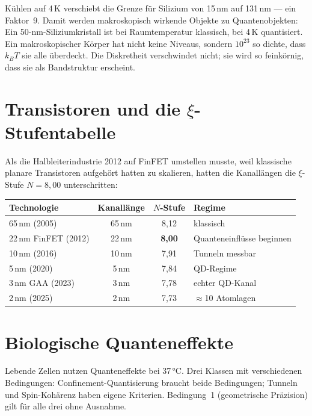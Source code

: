 Kühlen auf 4\,K verschiebt die Grenze für Silizium von 15\,nm auf
131\,nm --- ein Faktor~9. Damit werden makroskopisch wirkende Objekte zu
Quantenobjekten: Ein 50-nm-Siliziumkristall ist bei Raumtemperatur
klassisch, bei 4\,K quantisiert. Ein makroskopischer Körper hat nicht
keine Niveaus, sondern $10^{23}$ so dichte, dass $k_BT$ sie alle
überdeckt. Die Diskretheit verschwindet nicht; sie wird so feinkörnig,
dass sie als Bandstruktur erscheint.

\section{Transistoren und die $\xi$-Stufentabelle}

Als die Halbleiterindustrie 2012 auf FinFET umstellen musste, weil
klassische planare Transistoren aufgehört hatten zu skalieren, hatten die
Kanallängen die $\xi$-Stufe $N = 8{,}00$ unterschritten:

\begin{center}
\small
\begin{tabular}{p{3.5cm}ccp{2.8cm}}
\toprule
\textbf{Technologie} & \textbf{Kanallänge} & \textbf{$N$-Stufe} & \textbf{Regime} \\
\midrule
65\,nm (2005) & 65\,nm & 8{,}12 & klassisch \\
22\,nm FinFET (2012) & 22\,nm & \textbf{8{,}00} & Quanteneinflüsse beginnen \\
10\,nm (2016) & 10\,nm & 7{,}91 & Tunneln messbar \\
5\,nm (2020) & 5\,nm & 7{,}84 & QD-Regime \\
3\,nm GAA (2023) & 3\,nm & 7{,}78 & echter QD-Kanal \\
2\,nm (2025) & 2\,nm & 7{,}73 & $\approx$10 Atomlagen \\
\bottomrule
\end{tabular}
\end{center}

\section{Biologische Quanteneffekte}

Lebende Zellen nutzen Quanteneffekte bei 37\,°C. Drei Klassen mit
verschiedenen Bedingungen: Confinement-Quantisierung braucht beide
Bedingungen; Tunneln und Spin-Kohärenz haben eigene Kriterien.
Bedingung~1 (geometrische Präzision) gilt für alle drei ohne Ausnahme.

